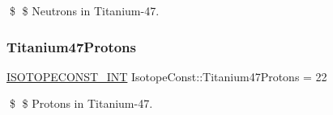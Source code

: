 \$ \$ Neutrons in Titanium-\/47. \mbox{\label{group___isotope_const-_titanium-_ti47_gafe93a3e017fdf521b8ca6e14fe1a51ab}} 
\subsubsection{\texorpdfstring{Titanium47\+Protons}{Titanium47Protons}}
{\footnotesize\ttfamily \mbox{\hyperlink{group___isotope_const-_macros_ga5f18360b3e99483a35c32d789e62621c}{I\+S\+O\+T\+O\+P\+E\+C\+O\+N\+S\+T\+\_\+\+I\+NT}} Isotope\+Const\+::\+Titanium47\+Protons = 22}

\$ \$ Protons in Titanium-\/47. 